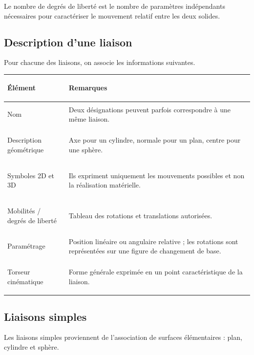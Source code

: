 Le nombre de degrés de liberté est le nombre de paramètres indépendants
nécessaires pour caractériser le mouvement relatif entre les deux solides.

\subsection{Description d'une liaison}

Pour chacune des liaisons, on associe les informations suivantes.

\begingroup
\setlength{\tabcolsep}{4pt}
\begin{tabularx}{\linewidth}{|>{\bfseries\raggedright\arraybackslash\hspace{0pt}}p{.25\linewidth}|>{\raggedright\arraybackslash\hspace{0pt}}X|}
\hline
\rowcolor{TLTableHeader}Élément & Remarques\\ \hline
Nom & Deux désignations peuvent parfois correspondre à une même liaison.\\ \hline
Description géométrique & Axe pour un cylindre, normale pour un plan, centre pour une sphère.\\ \hline
Symboles 2D et 3D & Ils expriment uniquement les mouvements possibles et non la réalisation matérielle.\\ \hline
\makecell[l]{Mobilités /\\degrés de liberté} & Tableau des rotations et translations autorisées.\\ \hline
Paramétrage & Position linéaire ou angulaire relative ; les rotations sont représentées sur une figure de changement de base.\\ \hline
Torseur cinématique & Forme générale exprimée en un point caractéristique de la liaison.\\ \hline
\end{tabularx}
\endgroup

\subsection{Liaisons simples}

Les liaisons simples proviennent de l'association de surfaces élémentaires :
plan, cylindre et sphère.


